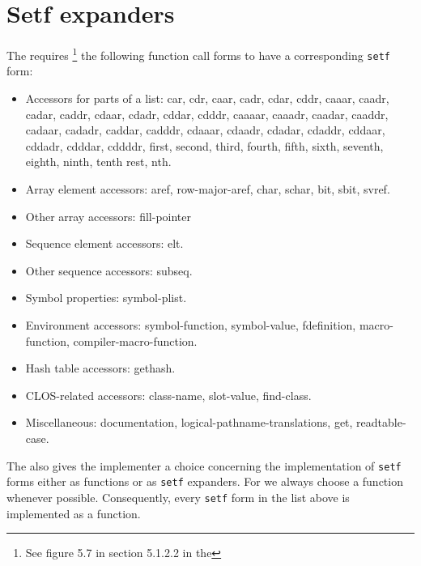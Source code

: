\chapter{Setf expanders}

The \hs{} requires%
\footnote{See figure 5.7 in section 5.1.2.2 in the \hs{}} 
the following function call forms to have a corresponding
\texttt{setf} form:

\begin{itemize}
\item Accessors for parts of a list: 
  car, cdr, caar, cadr, cdar, cddr, caaar, caadr, cadar, caddr,
  cdaar, cdadr, cddar, cdddr, caaaar, caaadr, caadar, caaddr, 
  cadaar, cadadr, caddar, cadddr, 
  cdaaar, cdaadr, cdadar, cdaddr, 
  cddaar, cddadr, cdddar, cddddr, 
  first, second, third, fourth, fifth,
  sixth, seventh, eighth, ninth, tenth
  rest, nth.
\item Array element accessors: 
  aref, row-major-aref, char, schar, bit, sbit, svref.
\item Other array accessors: fill-pointer
\item Sequence element accessors: elt.
\item Other sequence accessors: subseq.
\item Symbol properties: symbol-plist.
\item Environment accessors:
  symbol-function, symbol-value, fdefinition, 
  macro-function, compiler-macro-function.
\item Hash table accessors: gethash.
\item CLOS-related accessors: class-name, slot-value, find-class.
\item Miscellaneous: documentation,
  logical-pathname-translations, get, 
  readtable-case.
\end{itemize}

The \hs{} also gives the implementer a choice concerning the
implementation of \texttt{setf} forms either as functions or as
\texttt{setf} expanders.  For \sysname{} we always choose a function
whenever possible.  Consequently, every \texttt{setf} form in
the list above is implemented as a function.


